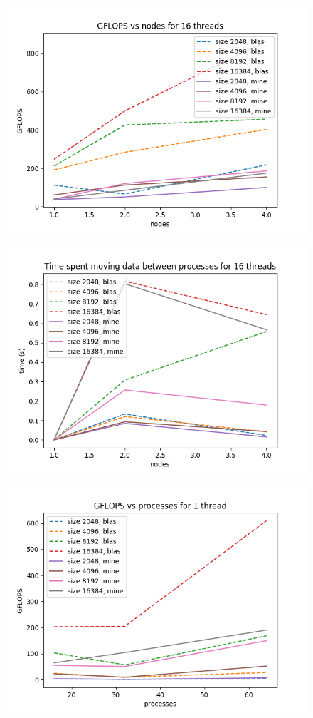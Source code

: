 \documentclass{article}
\begin{document}
\begin{figure}[]
    \centering
    \includegraphics[width=0.8\linewidth]{gflops_nodes_16_threads.png}
\end{figure}

\begin{figure}[]
    \centering
    \includegraphics[width=0.8\linewidth]{time_nodes_16_threads.png}
\end{figure}


\begin{figure}[]
    \centering
    \includegraphics[width=0.8\linewidth]{gflops_processes_1_thread.png}
\end{figure}
\end{document}

